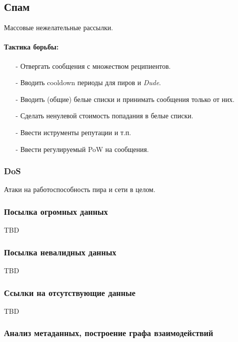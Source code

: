 \documentclass[11pt,a4paper]{article}
\newcommand{\term}[2]{\textit{#2}}
\newcommand{\Dude}{\term{dude}{Dude}}
\begin{document}
\subsection{Спам}

Массовые нежелательные рассылки.

\paragraph{Тактика борьбы:}

\begin{itemize}
 \item[-] Отвергать сообщения с множеством реципиентов.
 \item[-] Вводить cooldown периоды для пиров и \Dude{}.
 \item[-] Вводить (общие) белые списки и принимать сообщения только от них.
 \item[-] Сделать ненулевой стоимость попадания в белые списки.
 \item[-] Ввести иструменты репутации и т.п.
 \item[-] Ввести регулируемый PoW на сообщения.
\end{itemize}

\subsubsection{DoS}

Атаки на работоспособность пира и сети в целом.

\subsubsection{Посылка огромных данных}

TBD

\subsubsection{Посылка невалидных данных}

TBD

\subsubsection{Ссылки на отсутствующие данные}

TBD

\subsubsection{Анализ метаданных, построение графа взаимодействий}
\end{document}
